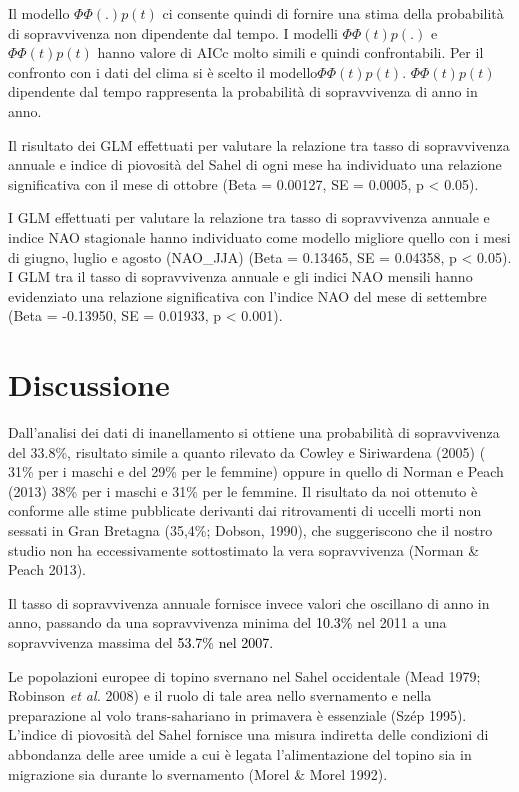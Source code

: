 Il modello $\Phi\Phi(.)p(t)$ ci consente quindi di fornire una stima della probabilit\`a
di sopravvivenza non dipendente dal tempo. I modelli $\Phi\Phi(t)p(.)$ e
$\Phi\Phi(t)p(t)$ hanno valore di AICc molto simili e quindi confrontabili. Per
il confronto con i dati del clima si \`e scelto il modello$\Phi\Phi(t)p(t)$.
$\Phi\Phi(t)p(t)$ dipendente dal tempo rappresenta la probabilit\`a di sopravvivenza
di anno in anno. 

Il risultato dei GLM effettuati per valutare la relazione tra tasso di
sopravvivenza annuale e indice di piovosit\`a del Sahel di ogni mese ha
individuato una relazione significativa con il mese di ottobre (Beta =
0.00127, SE = 0.0005, p {\textless} 0.05).

I GLM effettuati per valutare la relazione tra tasso di sopravvivenza
annuale e indice NAO stagionale hanno individuato come modello migliore
quello con i mesi di giugno, luglio e agosto (NAO\_JJA) (Beta =
0.13465, SE = 0.04358, p {\textless} 0.05). I GLM tra il tasso di
sopravvivenza annuale e gli indici NAO mensili hanno evidenziato una
relazione significativa con l{\textquoteright}indice NAO del mese di
settembre (Beta = -0.13950, SE = 0.01933, p {\textless} 0.001).

\section*{Discussione}

Dall{\textquoteright}analisi dei dati di inanellamento si ottiene una
probabilit\`a di sopravvivenza del 33.8\%, risultato simile a quanto
rilevato da Cowley e Siriwardena (2005) ( 31\% per i
maschi e del 29\% per le femmine) oppure in quello di Norman e Peach
(2013) 38\% per i maschi e 31\% per le femmine. Il risultato da noi
ottenuto \`e conforme alle stime pubblicate derivanti dai ritrovamenti
di uccelli morti non sessati in Gran Bretagna (35,4\%; Dobson, 1990),
che suggeriscono che il nostro studio non ha eccessivamente
sottostimato la vera sopravvivenza (Norman \& Peach 2013).

Il tasso di sopravvivenza annuale fornisce invece valori che oscillano
di anno in anno, passando da una sopravvivenza minima
del\textcolor{black}{ 10.3\%} nel 2011 a una sopravvivenza massima del
\textcolor{black}{53.7\% nel 2007.}

Le popolazioni europee di topino svernano nel Sahel occidentale (Mead
1979; Robinson \textit{et al.} 2008) e il ruolo di tale area nello
svernamento e nella preparazione al volo trans-sahariano in primavera
\`e essenziale (Sz\'ep 1995). L{\textquoteright}indice di piovosit\`a
del Sahel fornisce una misura indiretta delle condizioni di abbondanza
delle aree umide a cui \`e legata l{\textquoteright}alimentazione del
topino sia in migrazione sia durante lo svernamento (Morel \& Morel
1992). 

